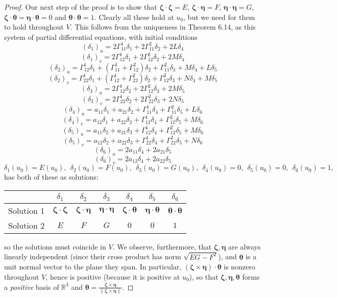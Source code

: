 \documentclass[leqno]{book}
\begin{document}
\begin{proof}
Our next step of the proof is to show that $\boldsymbol\zeta\cdot\boldsymbol\zeta=E$, $\boldsymbol\zeta\cdot\boldsymbol\eta=F$, $\boldsymbol\eta\cdot\boldsymbol\eta=G$, $\boldsymbol\zeta\cdot\boldsymbol\theta=\boldsymbol\eta\cdot\boldsymbol\theta=0$ and $\boldsymbol\theta\cdot\boldsymbol\theta=1$.  Clearly all these hold at $u_0$, but we need for them to hold throughout $V$.  This follows from the uniqueness in Theorem 6.14, as this system of partial differential equations, with initial conditions
$$(\delta_1)_u=2\Gamma_{11}^1\delta_1+2\Gamma_{11}^2\delta_2+2L\delta_4$$
$$(\delta_1)_v=2\Gamma_{12}^1\delta_1+2\Gamma_{12}^2\delta_2+2M\delta_4$$
$$(\delta_2)_u=\Gamma_{12}^1\delta_1+(\Gamma_{11}^1+\Gamma_{12}^2)\delta_2+\Gamma_{11}^2\delta_3+M\delta_4+L\delta_5$$
$$(\delta_2)_v=\Gamma_{22}^1\delta_1+(\Gamma_{12}^1+\Gamma_{22}^2)\delta_2+\Gamma_{12}^2\delta_3+N\delta_4+M\delta_5$$
$$(\delta_3)_u=2\Gamma_{12}^1\delta_2+2\Gamma_{12}^2\delta_3+2M\delta_5$$
$$(\delta_3)_v=2\Gamma_{22}^1\delta_2+2\Gamma_{22}^2\delta_3+2N\delta_5$$
$$(\delta_4)_u=a_{11}\delta_1+a_{21}\delta_2+\Gamma_{11}^1\delta_4+\Gamma_{11}^2\delta_5+L\delta_6$$
$$(\delta_4)_v=a_{12}\delta_1+a_{22}\delta_2+\Gamma_{12}^1\delta_4+\Gamma_{12}^2\delta_5+M\delta_6$$
$$(\delta_5)_u=a_{11}\delta_2+a_{21}\delta_3+\Gamma_{12}^1\delta_4+\Gamma_{12}^2\delta_5+M\delta_6$$
$$(\delta_5)_v=a_{12}\delta_2+a_{22}\delta_3+\Gamma_{22}^1\delta_4+\Gamma_{22}^2\delta_5+N\delta_6$$
$$(\delta_6)_u=2a_{11}\delta_4+2a_{21}\delta_5$$
$$(\delta_6)_v=2a_{12}\delta_4+2a_{22}\delta_5$$
$$\delta_1(u_0)=E(u_0),~~\delta_2(u_0)=F(u_0),~~\delta_3(u_0)=G(u_0),~~\delta_4(u_0)=0,~~\delta_5(u_0)=0,~~\delta_6(u_0)=1,$$
has both of these as solutions:
\begin{center}
\begin{tabular}{c|cccccc}
&$\delta_1$&$\delta_2$&$\delta_3$&$\delta_4$&$\delta_5$&$\delta_6$\\\hline
Solution 1&$\boldsymbol\zeta\cdot\boldsymbol\zeta$&$\boldsymbol\zeta\cdot\boldsymbol\eta$&$\boldsymbol\eta\cdot\boldsymbol\eta$&$\boldsymbol\zeta\cdot\boldsymbol\theta$&$\boldsymbol\eta\cdot\boldsymbol\theta$&$\boldsymbol\theta\cdot\boldsymbol\theta$\\
Solution 2&$E$&$F$&$G$&$0$&$0$&$1$
\end{tabular}
\end{center}
so the solutions must coincide in $V$.  We observe, furthermore, that $\boldsymbol\zeta,\boldsymbol\eta$ are always linearly independent (since their cross product has norm $\sqrt{EG-F^2}$), and $\boldsymbol\theta$ is a unit normal vector to the plane they span.  In particular, $(\boldsymbol\zeta\times\boldsymbol\eta)\cdot\boldsymbol\theta$ is nonzero throughout $V$, hence is positive (because it is positive at $u_0$), so that $\boldsymbol\zeta,\boldsymbol\eta,\boldsymbol\theta$ forms a \emph{positive} basis of $\mathbb R^3$ and $\boldsymbol\theta=\frac{\boldsymbol\zeta\times\boldsymbol\eta}{\|\boldsymbol\zeta\times\boldsymbol\eta\|}$.


\end{proof}
\end{document}
